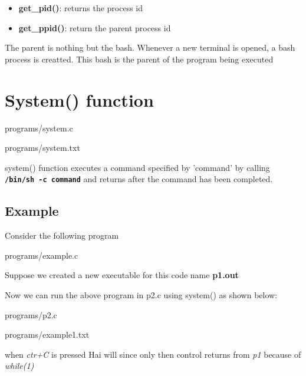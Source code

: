 \documentclass[11pt,fleqn]{book} %
\begin{document}
\begin{myremark}{}
\begin{itemize}
	\item \textbf{get\_pid()}: returns the process id
	\item \textbf{get\_ppid()}: return the parent process id 
\end{itemize}
\end{myremark}

The parent is nothing but the bash. Whenever a new terminal is opened, a bash process is creatted. This bash is the parent of the program being executed

\section{System() function}

\begin{mycode}{programs/system.c}
\end{mycode}

\begin{myoutput}{programs/system.txt}
\end{myoutput}

system() function executes a command specified by 'command' by calling \textbf{\texttt{/bin/sh -c command}} and returns after the command has been completed.

\subsection*{Example}

Consider the following program

\begin{mycode}{programs/example.c}
\end{mycode}

Suppose we created a new executable for this code name \textbf{p1.out}

Now we can run the above program in p2.c using system() as shown below:

\begin{mycode}{programs/p2.c}
\end{mycode}

\begin{myoutput}{programs/example1.txt}
\end{myoutput}

when \textit{ctr+C} is pressed Hai will since only then control returns from \textit{p1} because of \textit{while(1)}
\end{document}
